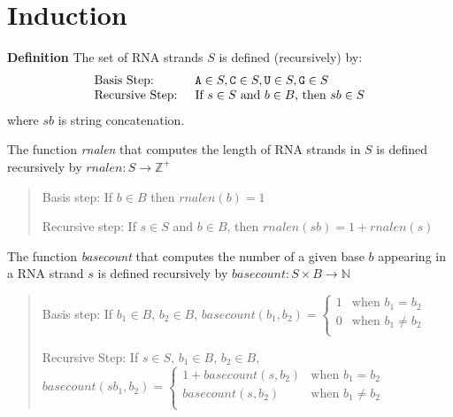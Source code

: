 \documentclass[12pt, oneside]{article}
\begin{document}
\section*{Induction}
{\bf Definition} The set of RNA strands $S$ is defined (recursively) by:
\[
\begin{array}{ll}
\textrm{Basis Step: } & \texttt{A} \in S, \texttt{C} \in S, \texttt{U} \in S, \texttt{G} \in S \\
\textrm{Recursive Step: } & \textrm{If } s \in S\textrm{ and }b \in B \textrm{, then }sb \in S
\end{array}
\]
where $sb$ is string concatenation.

The function \textit{rnalen} that computes the length of RNA strands in $S$ is defined recursively by
$rnalen: S  \to \mathbb{Z}^+$

\vspace{-20pt}

\begin{quote}
Basis step: If $b \in B$ then $rnalen(b)  = 1$

Recursive step: If $s \in S$ and $b \in B$, then $rnalen(sb)  = 1 + rnalen(s)$
\end{quote}

\vspace{-20pt}

The function \textit{basecount} that computes the number of a given base $b$ appearing in a RNA strand $s$ is defined recursively by $basecount : S \times B \to\mathbb{N}$

\vspace{-20pt}

\begin{quote}
Basis step: If  $b_1 \in B$, $b_2 \in B$, $basecount(b_1, b_2) =
        \begin{cases}
            1 & \textrm{when } b_1 = b_2 \\
            0 & \textrm{when } b_1 \neq b_2 \\
        \end{cases}$

Recursive Step: If $s \in S$, $b_1 \in B$, $b_2 \in B$, $basecount(s b_1, b_2) =
        \begin{cases}
            1 + \textit{basecount}(s, b_2) & \textrm{when } b_1 = b_2 \\
            \textit{basecount}(s, b_2) & \textrm{when } b_1 \neq b_2 \\
        \end{cases}$
\end{quote}
\end{document}
